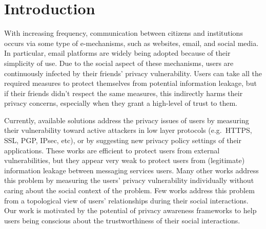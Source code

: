 \section{Introduction} \label{sec:Introduction}

With increasing frequency,
	communication between citizens and institutions occurs via some type of e-mechanisms,
	such as websites,
	email,
	and social media.
In particular,
	email platforms are widely being adopted because of their simplicity of use.
Due to the social aspect of these mechanisms,
	users are continuously infected by their friends' privacy vulnerability.
Users can take all the required measures to protect themselves from potential information leakage,
	but if their friends didn't respect the same measures,
	this indirectly harms their privacy concerns,
	especially when they grant a high-level of trust to them.

Currently,
	available solutions address the privacy issues of users by measuring their vulnerability toward active attackers in low layer protocols (e.g.~HTTPS,
	SSL,
	PGP,
	IPsec,
	etc),
	or by suggesting new privacy policy settings of their applications.
These works are efficient to protect users from external vulnerabilities,
	but they appear very weak to protect users from (legitimate) information leakage between messaging services users.
Many other works \cite{liu_framework_2010} address this problem by measuring the users' privacy vulnerability individually without caring about the social context of the problem.
Few works \cite{zeng_trustaware_2014} \cite{b.s._privacy_2015} address this problem from a topological view of users' relationships during their social interactions.
Our work is motivated by the potential of privacy awareness frameworks to help users being conscious about the trustworthiness of their social interactions.

